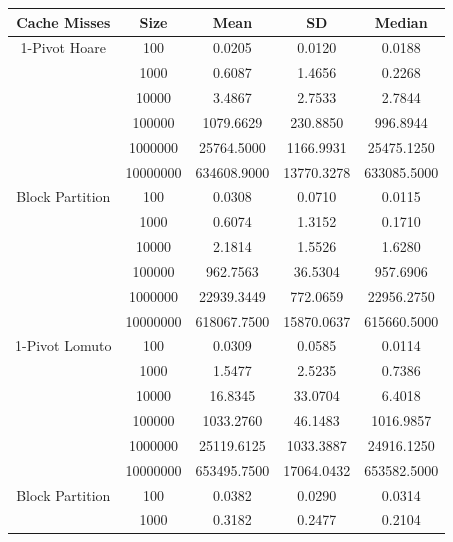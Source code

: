 \documentclass{article}
\begin{document}
\begin{center}
    \small
    \begin{tabular}{ |c c | c c c| }
        \hline
        Cache Misses    & Size     & Mean           & SD            & Median \\
        \hline
        1-Pivot Hoare   & 100      & 0.0205         & 0.0120        & 0.0188 \\
                        & 1000     & 0.6087         & 1.4656        & 0.2268 \\
                        & 10000    & 3.4867         & 2.7533        & 2.7844 \\
                        & 100000   & 1079.6629      & 230.8850      & 996.8944 \\
                        & 1000000  & 25764.5000     & 1166.9931     & 25475.1250 \\
                        & 10000000 & 634608.9000    & 13770.3278    & 633085.5000 \\
        Block Partition & 100      & 0.0308         & 0.0710        & 0.0115 \\
                        & 1000     & 0.6074         & 1.3152        & 0.1710 \\
                        & 10000    & 2.1814         & 1.5526        & 1.6280 \\
                        & 100000   & 962.7563       & 36.5304       & 957.6906 \\
                        & 1000000  & 22939.3449     & 772.0659      & 22956.2750 \\
                        & 10000000 & 618067.7500    & 15870.0637    & 615660.5000 \\
        \hline
        1-Pivot Lomuto  & 100      & 0.0309         & 0.0585        & 0.0114 \\
                        & 1000     & 1.5477         & 2.5235        & 0.7386 \\
                        & 10000    & 16.8345        & 33.0704       & 6.4018 \\
                        & 100000   & 1033.2760      & 46.1483       & 1016.9857 \\
                        & 1000000  & 25119.6125     & 1033.3887     & 24916.1250 \\
                        & 10000000 & 653495.7500    & 17064.0432    & 653582.5000 \\
        Block Partition & 100      & 0.0382         & 0.0290        & 0.0314 \\
                        & 1000     & 0.3182         & 0.2477        & 0.2104 \\

\end{tabular}
\end{center}
\end{document}
